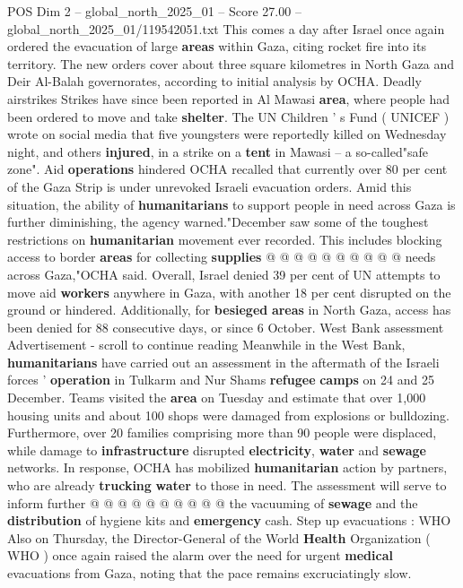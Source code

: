 \begin{textsample}{POS Dim 2 – global\_north\_2025\_01 – Score 27.00 – global\_north\_2025\_01/119542051.txt}  \label{ex:f2_pos_365}
This comes a day after Israel once again ordered the evacuation of large \textbf{areas} within Gaza, citing rocket fire into its territory.
The new orders cover about three square kilometres in North Gaza and Deir Al-Balah governorates, according to initial analysis by OCHA.
Deadly airstrikes Strikes have since been reported in Al Mawasi \textbf{area}, where people had been ordered to move and take \textbf{shelter}.
The UN Children ' s Fund ( UNICEF ) wrote on social media that five youngsters were reportedly killed on Wednesday night, and others \textbf{injured}, in a strike on a \textbf{tent} in Mawasi -- a so-called"safe zone".
Aid \textbf{operations} hindered OCHA recalled that currently over 80 per cent of the Gaza Strip is under unrevoked Israeli evacuation orders.
Amid this situation, the ability of \textbf{humanitarians} to support people in need across Gaza is further diminishing, the agency warned."December saw some of the toughest restrictions on \textbf{humanitarian} movement ever recorded.
This includes blocking access to border \textbf{areas} for collecting \textbf{supplies} @ @ @ @ @ @ @ @ @ @ needs across Gaza,"OCHA said.
Overall, Israel denied 39 per cent of UN attempts to move aid \textbf{workers} anywhere in Gaza, with another 18 per cent disrupted on the ground or hindered.
Additionally, for \textbf{besieged} \textbf{areas} in North Gaza, access has been denied for 88 consecutive days, or since 6 October.
West Bank assessment Advertisement - scroll to continue reading Meanwhile in the West Bank, \textbf{humanitarians} have carried out an assessment in the aftermath of the Israeli forces ' \textbf{operation} in Tulkarm and Nur Shams \textbf{refugee} \textbf{camps} on 24 and 25 December.
Teams visited the \textbf{area} on Tuesday and estimate that over 1,000 housing units and about 100 shops were damaged from explosions or bulldozing.
Furthermore, over 20 families comprising more than 90 people were displaced, while damage to \textbf{infrastructure} disrupted \textbf{electricity}, \textbf{water} and \textbf{sewage} networks.
In response, OCHA has mobilized \textbf{humanitarian} action by partners, who are already \textbf{trucking} \textbf{water} to those in need.
The assessment will serve to inform further @ @ @ @ @ @ @ @ @ @ the vacuuming of \textbf{sewage} and the \textbf{distribution} of hygiene kits and \textbf{emergency} cash.
Step up evacuations : WHO Also on Thursday, the Director-General of the World \textbf{Health} Organization ( WHO ) once again raised the alarm over the need for urgent \textbf{medical} evacuations from Gaza, noting that the pace remains excruciatingly slow.

\end{textsample}
